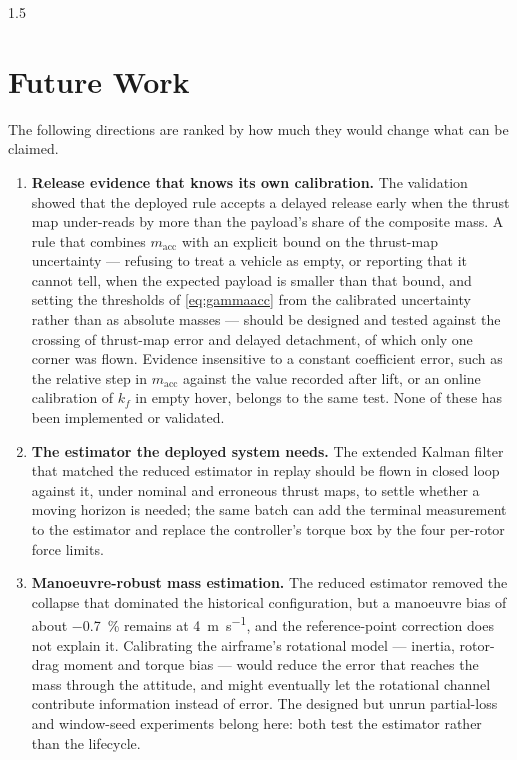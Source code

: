 \begin{spacing}{1.5}
\section{Future Work}

The following directions are ranked by how much they would change what can be
claimed.

\begin{enumerate}
\item \textbf{Release evidence that knows its own calibration.} The
validation showed that the deployed rule accepts a delayed release early when
the thrust map under-reads by more than the payload's share of the composite
mass. A rule that combines $m_{\mathrm{acc}}$ with an explicit bound on the
thrust-map uncertainty --- refusing to treat a vehicle as empty, or reporting
that it cannot tell, when the expected payload is smaller than that bound, and
setting the thresholds of \eqref{eq:gammaacc} from the calibrated uncertainty
rather than as absolute masses --- should be designed and tested against the
crossing of thrust-map error and delayed detachment, of which only one corner
was flown. Evidence insensitive to a constant coefficient error, such as the
relative step in $m_{\mathrm{acc}}$ against the value recorded after lift, or
an online calibration of $k_f$ in empty hover, belongs to the same test. None of
these has been implemented or validated.

\item \textbf{The estimator the deployed system needs.} The extended Kalman
filter that matched the reduced estimator in replay should be flown in closed
loop against it, under nominal and erroneous thrust maps, to settle whether a
moving horizon is needed; the same batch can add the terminal measurement to the
estimator and replace the controller's torque box by the four per-rotor force
limits.

\item \textbf{Manoeuvre-robust mass estimation.} The reduced estimator removed
the collapse that dominated the historical configuration, but a manoeuvre bias of
about \SI{-0.7}{\percent} remains at \SI{4}{\meter\per\second}, and the
reference-point correction does not explain it. Calibrating the
airframe's rotational model --- inertia, rotor-drag moment and torque bias ---
would reduce the error that reaches the mass through the attitude, and might
eventually let the rotational channel contribute information instead of error.
The designed but unrun partial-loss and window-seed experiments belong here: both
test the estimator rather than the lifecycle.


\end{enumerate}
\end{spacing}
